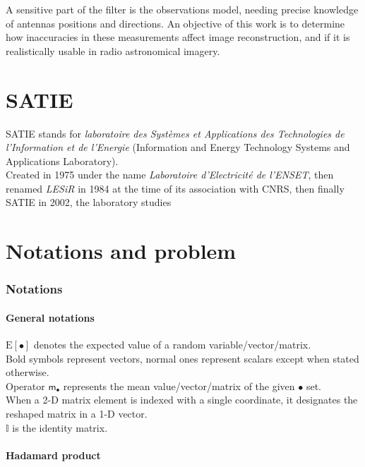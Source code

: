 \documentclass[titlepage]{article}
\newcommand{\moy}[1]{\boldsymbol{\mathsf{m}}_{#1}}
\renewcommand{\expval}[1]{\text{E}\left[#1\right]}
\begin{document}
	A sensitive part of the filter is the observations model, needing precise knowledge of antennas positions and directions. An objective of this work is to determine how inaccuracies in these measurements affect image reconstruction, and if it is realistically usable in radio astronomical imagery. \\
	
	\newpage
	\part{SATIE}
	
	SATIE stands for \emph{laboratoire des Systèmes et Applications des Technologies de l'Information et de l'Energie} (Information and Energy Technology Systems and Applications Laboratory).\\
	Created in 1975 under the name \emph{Laboratoire d'Electricité de l'ENSET}, then renamed \emph{LESiR} in 1984 at the time of its association with CNRS, then finally SATIE in 2002, the laboratory studies
	
	\newpage
	\part{Notations and problem}
	\section{Notations}
	
	\subsection{General notations}
	
	$\expval{\bullet}$ denotes the expected value of a random variable/vector/matrix.\\
	
	Bold symbols represent vectors, normal ones represent scalars except when stated otherwise.\\
	
	Operator $\moy{\bullet}$ represents the mean value/vector/matrix of the given $\bullet$ set.\\
	
	When a 2-D matrix element is indexed with a single coordinate, it designates the reshaped matrix in a 1-D vector.\\
	
	$\mathbb{I}$ is the identity matrix.
	
	
		\subsection{Hadamard product}
	
\end{document}
